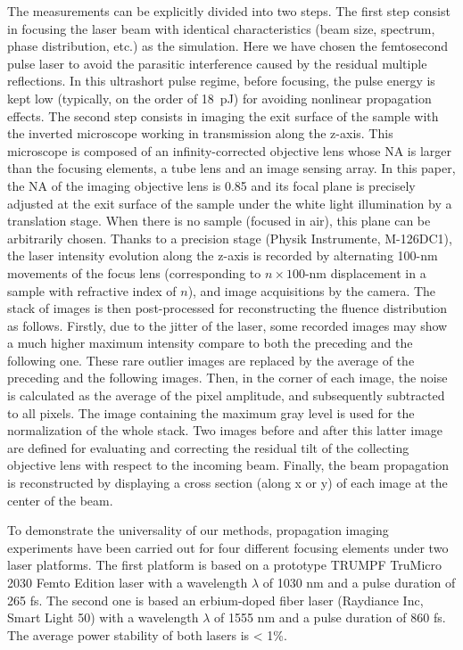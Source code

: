 \documentclass[9pt,twocolumn,twoside]{osajnl}
\begin{document}
The measurements can be explicitly divided into two steps. The first step consist in focusing the laser beam with identical characteristics (beam size, spectrum, phase distribution, etc.) as the simulation. Here we have chosen the femtosecond pulse laser to avoid the parasitic interference caused by the residual multiple reflections. In this ultrashort pulse regime, before focusing, the pulse energy is kept low (typically, on the order of 18~pJ) for avoiding nonlinear propagation effects. The second step consists in imaging the exit surface of the sample with the inverted microscope working in transmission along the z-axis. This microscope is composed of an infinity-corrected objective lens whose NA is larger than the focusing elements, a tube lens and an image sensing array. In this paper, the NA of the imaging objective lens is 0.85 and its focal plane is precisely adjusted at the exit surface of the sample under the white light illumination by a translation stage. When there is no sample (focused in air), this plane can be arbitrarily chosen. Thanks to a precision stage (Physik Instrumente, M-126DC1), the laser intensity evolution along the z-axis is recorded by alternating 100-nm movements of the focus lens (corresponding to $n\times100$-nm displacement in a sample with refractive index of $n$), and image acquisitions by the camera. The stack of images is then post-processed for reconstructing the fluence distribution as follows. Firstly, due to the jitter of the laser, some recorded images may show a much higher maximum intensity compare to both the preceding and the following one. These rare outlier images are replaced by the average of the preceding and the following images. Then, in the corner of each image, the noise is calculated as the average of the pixel amplitude, and subsequently subtracted to all pixels. The image containing the maximum gray level is used for the normalization of the whole stack. Two images before and after this latter image are defined for evaluating and correcting the residual tilt of the collecting objective lens with respect to the incoming beam. Finally, the beam propagation is reconstructed by displaying a cross section (along x or y) of each image at the center of the beam. 

To demonstrate the universality of our methods, propagation imaging experiments have been carried out for four different focusing elements under two laser platforms. The first platform is based on a prototype TRUMPF TruMicro 2030 Femto Edition laser with a wavelength $\lambda$ of 1030 nm and a pulse duration of 265 fs. The second one is based an erbium-doped fiber laser (Raydiance Inc, Smart Light 50) with a wavelength $\lambda$ of 1555 nm and a pulse duration of 860 fs. The average power stability of both lasers is < 1\%. 
\end{document}

